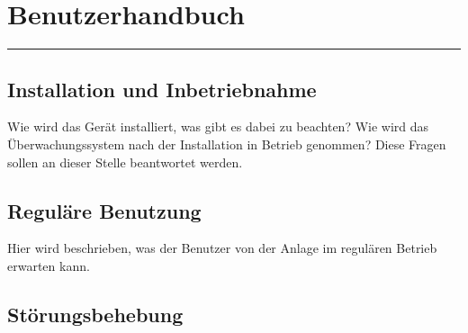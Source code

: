 \chapter{Benutzerhandbuch}
\label{chap:userguide}

{%
    \small
    \startcontents[chapters]
}

\plainbreak{1}

\section{Installation und Inbetriebnahme}
\label{sec:userguide:installation}

Wie wird das Ger\"at installiert, was  gibt es dabei zu beachten? Wie wird das
\"Uberwachungssystem nach  der Installation in Betrieb  genommen? Diese Fragen
sollen an dieser Stelle beantwortet werden.


\section{Regul\"are Benutzung}
\label{sec:userguide:regular}

Hier wird beschrieben, was der Benutzer  von der Anlage im regul\"aren Betrieb
erwarten kann.

\section{St\"orungsbehebung}
\label{sec:userguide:errors}
